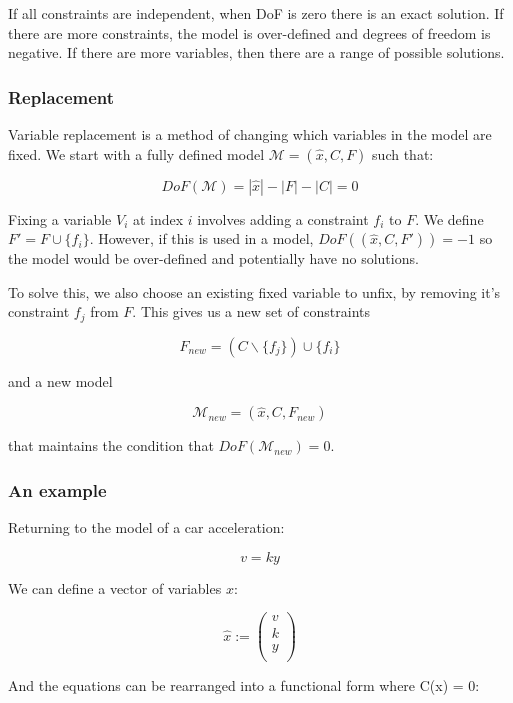 If all constraints are independent, when DoF is zero there is an exact
solution. If there are more constraints, the model is over-defined and
degrees of freedom is negative. If there are more variables, then there
are a range of possible solutions.

\hypertarget{replacement}{%
\subsubsection{Replacement}\label{replacement}}

Variable replacement is a method of changing which variables in the
model are fixed. We start with a fully defined model
\(\mathcal{M} = (\hat{x}, C, F)\) such that:

\[
DoF(\mathcal{M}) = |\hat{x}| - |F| - |C|  = 0
\]

Fixing a variable \(V_i\) at index \(i\) involves adding a constraint
\(f_i\) to \(F\). We define \(F' = F \cup \{f_i\}\). However, if this is
used in a model, \(DoF((\hat{x},C,F')) = -1\) so the model would be
over-defined and potentially have no solutions.

To solve this, we also choose an existing fixed variable to unfix, by
removing it's constraint \(f_j\) from \(F\). This gives us a new set of
constraints

\[
F_{new} = (C \backslash \{f_j\}) \cup \{f_i\}
\]

and a new model

\[
\mathcal{M}_{new} = (\hat{x},C,F_{new})
\]

that maintains the condition that \(DoF(\mathcal{M}_{new}) = 0\).

\hypertarget{an-example}{%
\subsubsection{An example}\label{an-example}}

Returning to the model of a car acceleration:

\[
v = ky
\]

We can define a vector of variables \(x\):

\[
\hat{x} :=
\begin{pmatrix}
v \\
k \\
y \\
\end{pmatrix}
\]

And the equations can be rearranged into a functional form where C(x) =
0:


